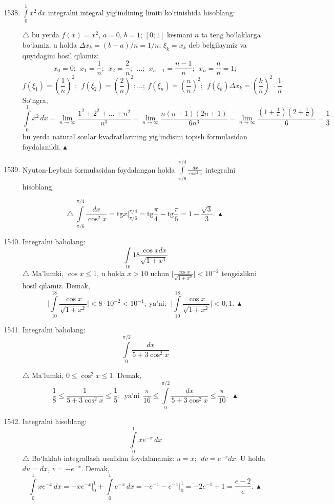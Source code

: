 \begin{enumerate}
	\setcounter{enumi}{1537}
	\item $\int\limits_{0}^{1}x^{2}\, dx$ integralni integral yig`indining limiti ko`rinishida hisoblang: 
	
	$\triangle$ bu yerda $f(x)=x^{2}$, $a=0$, $b=1$; $[0;1]$ kesmani $n$ ta teng bo`laklarga bo`lamiz, u holda $\Delta x_{k}=(b-a)/n=1/n$; $\xi_k=x_k$ deb belgilaymiz va quyidagini hosil qilamiz:
	$$x_0 =0; \ \ x_{1}=\frac{1}{n};\ \ x_{2}=\frac{2}{n};\ \ \ldots;\ \ x_{n-1}=\frac{n-1}{n};\ \ x_{n}=\frac{n}{n}=1;$$
	$$f(\xi_{1})=\left(\frac{1}{n}\right)^{2};\ \ f(\xi_{2})=\left(\frac{2}{n}\right)^{2};\ldots;\ f(\xi_{n})=\left(\frac{n}{n}\right)^{2};\ \ f(\xi_{k})\Delta x_{k}=\left(\frac{k}{n}\right)^{2}\cdot\frac{1}{n}$$
	So`ngra,
	$$\int\limits_{0}^{1}x^{2}\,dx=\lim\limits_{n\to\infty} \frac{1^{2}+2^{2}+\ldots+n^{2}}{n^{3}}=\lim\limits_ {n\to\infty}\frac{n(n+1)(2n+1)}{6n^{3}}=\lim\limits_ {n\to\infty}\frac{\left(1+\frac{1}{n}\right)\left(2+\frac{1}{n}\right)}{6}=\frac{1}{3}$$
	bu yerda natural sonlar kvadratlarining yig`indisini topish formulasidan foydalanildi. $\blacktriangle$
	
	\item Nyuton-Leybnis formulasidan foydalangan holda $\int\limits_{\pi/6}^{\pi/4}\frac{dx}{\cos^{2}x}$ integralni hisoblang.
	
	$$\triangle\ \int\limits_{\pi/6}^{\pi/4}\frac{dx}{\cos^{2}x}=\textrm{tg}x\Big|_{\pi/6}^{\pi/4}=\textrm{tg}\frac{\pi}{4}-\textrm{tg}\frac{\pi}{6}=1-\frac{\sqrt{3}}{3}.\ \blacktriangle$$
	
	\item Integralni baholang:
	$$\int\limits_{10}{18}\frac{\cos{x}dx}{\sqrt{1+x^{4}}}$$
	$\triangle$ Ma'lumki, $\cos{x}\le1$, u holda $x>10$ uchun $\Big|\frac{\cos{x}}{\sqrt{1+x^{2}}} \Big|<10^{-2}$ tengsizlikni hosil qilamiz. Demak,
	$$\bigg|\int\limits_{10}^{18}\frac{\cos{x}}{\sqrt{1+x^{2}}} \bigg|<8\cdot10^{-2}<10^{-1};\ 
	\textrm{ya'ni},\ \
	\bigg|\int\limits_{10}^{18}\frac{\cos{x}}{\sqrt{1+x^{2}}} \bigg|<0,1.\ \blacktriangle$$
	
	\item Integralni baholang:
	$$\int\limits_{0}^{\pi/2}\frac{dx}{5+3\cos^{2}{x}}$$
	
	$\triangle$ Ma'lumki, $0\le\cos^{2}{x}\le1$. Demak,
	$$\frac{1}{8}\le\frac{1}{5+3\cos^{2}{x}}\le\frac{1}{5};\ \ \textrm{ya'ni} \ \ \frac{\pi}{16}\le\int\limits_{0}^{\pi/2}\frac{dx}{5+3\cos^{2}{x}}\le\frac{\pi}{10}.\ \ \blacktriangle$$
	
	\item Integralni hisoblang:
	$$\int\limits_{0}^{1}xe^{-x}\,dx$$
	$\triangle$ Bo`laklab integrallash usulidan foydalanamiz: $u=x;\ \ dv=e^{-x}dx$. U holda $du=dx$, $v=-e^{-x}$. Demak,
	$$\int\limits_{0}^{1}xe^{-x}\,dx=-xe^{-x}\bigg|_{0}^{1}+\int\limits_{0}^{1}e^{-x}\,dx=-e^{-1}-e^{-x}\bigg|_{0}^{1}=-2e^{-1}+1=\frac{e-2}{e}.\ \blacktriangle$$
	

\end{enumerate}
